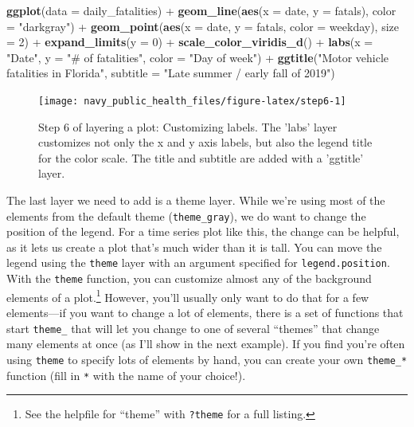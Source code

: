 \documentclass[]{tufte-book}
\newenvironment{Shaded}{}{}
\newcommand{\DataTypeTok}[1]{\textcolor[rgb]{0.56,0.13,0.00}{#1}}
\newcommand{\DecValTok}[1]{\textcolor[rgb]{0.25,0.63,0.44}{#1}}
\newcommand{\KeywordTok}[1]{\textcolor[rgb]{0.00,0.44,0.13}{\textbf{#1}}}
\newcommand{\NormalTok}[1]{#1}
\newcommand{\OperatorTok}[1]{\textcolor[rgb]{0.40,0.40,0.40}{#1}}
\newcommand{\StringTok}[1]{\textcolor[rgb]{0.25,0.44,0.63}{#1}}
\begin{document}
\begin{Shaded}
\begin{Highlighting}[]
\KeywordTok{ggplot}\NormalTok{(}\DataTypeTok{data =}\NormalTok{ daily_fatalities) }\OperatorTok{+}\StringTok{ }\KeywordTok{geom_line}\NormalTok{(}\KeywordTok{aes}\NormalTok{(}\DataTypeTok{x =}\NormalTok{ date, }
    \DataTypeTok{y =}\NormalTok{ fatals), }\DataTypeTok{color =} \StringTok{"darkgray"}\NormalTok{) }\OperatorTok{+}\StringTok{ }\KeywordTok{geom_point}\NormalTok{(}\KeywordTok{aes}\NormalTok{(}\DataTypeTok{x =}\NormalTok{ date, }
    \DataTypeTok{y =}\NormalTok{ fatals, }\DataTypeTok{color =}\NormalTok{ weekday), }\DataTypeTok{size =} \DecValTok{2}\NormalTok{) }\OperatorTok{+}\StringTok{ }
\StringTok{    }\KeywordTok{expand_limits}\NormalTok{(}\DataTypeTok{y =} \DecValTok{0}\NormalTok{) }\OperatorTok{+}\StringTok{ }\KeywordTok{scale_color_viridis_d}\NormalTok{() }\OperatorTok{+}\StringTok{ }
\StringTok{    }\KeywordTok{labs}\NormalTok{(}\DataTypeTok{x =} \StringTok{"Date"}\NormalTok{, }\DataTypeTok{y =} \StringTok{"# of fatalities"}\NormalTok{, }\DataTypeTok{color =} \StringTok{"Day of week"}\NormalTok{) }\OperatorTok{+}\StringTok{ }
\StringTok{    }\KeywordTok{ggtitle}\NormalTok{(}\StringTok{"Motor vehicle fatalities in Florida"}\NormalTok{, }
        \DataTypeTok{subtitle =} \StringTok{"Late summer / early fall of 2019"}\NormalTok{)}
\end{Highlighting}
\end{Shaded}

\begin{figure}
\texttt{[image: navy\_public\_health\_files/figure-latex/step6-1]} \caption[Step 6 of layering a plot]{Step 6 of layering a plot: Customizing labels. The 'labs' layer customizes not only the x and y axis labels, but also the legend title for the color scale. The title and subtitle are added with a 'ggtitle' layer.}\label{fig:step6}
\end{figure}

The last layer we need to add is a theme layer. While we're using most of the
elements from the default theme (\texttt{theme\_gray}), we do want to change the position
of the legend. For a time series plot like this, the change can be helpful, as it
lets us create a plot that's much wider than it is tall. You can move the legend
using the \texttt{theme} layer with an argument specified for \texttt{legend.position}. With
the \texttt{theme} function, you can customize almost any of the background elements of a
plot.\footnote{See the helpfile for ``theme'' with \texttt{?theme} for a full listing.}
However, you'll usually only want to do that for a few elements---if you want
to change a lot of elements, there is a set of functions that start \texttt{theme\_} that
will let you change to one of several ``themes'' that change many elements at once
(as I'll show in the next example).
If you find you're often using \texttt{theme} to specify lots of elements by hand, you
can create your own \texttt{theme\_*} function (fill in \texttt{*} with the name of your choice!).
\end{document}
